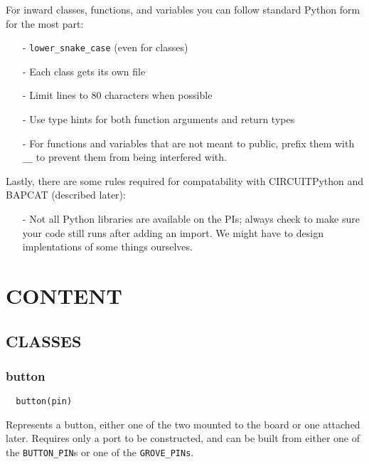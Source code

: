 \documentclass[12pt]{scrartcl} %
\begin{document}
For inward classes, functions, and variables you can follow standard Python
form for the most part:

\begin{itemize}
  \item[-] \texttt{lower_snake_case} (even for classes)
  \item[-] Each class gets its own file
  \item[-] Limit lines to 80 characters when possible
  \item[-] Use type hints for both function arguments and return types
  \item[-] For functions and variables that are not meant to public, prefix
    them with \texttt{__} to prevent them from being interfered
    with.
\end{itemize}

Lastly, there are some rules required for compatability with CIRCUITPython and
BAPCAT (described later):

\begin{itemize}
  \item[-] Not all Python libraries are available on the PIs; always check to
    make sure your code still runs after adding an import. We might have to
    design implentations of some things ourselves.
\end{itemize}

\newpage

\section{CONTENT}

\subsection{CLASSES}

\subsubsection{button}

\begin{verbatim}
  button(pin)
\end{verbatim}

Represents a button, either one of the two mounted to the board or one attached
later. Requires only a port to be constructed, and can be built from either one
of the \texttt{BUTTON_PIN}s or one of the
\texttt{GROVE_PINs}.
\end{document}
